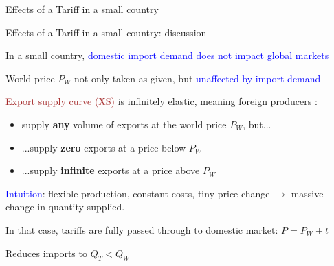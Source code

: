 \documentclass[notes,11pt, aspectratio=169, xcolor=table]{beamer}
\newcommand{\blue}[1]{\textcolor{blue}{#1}}
\newenvironment{wideitemize}{\itemize\addtolength{\itemsep}{10pt}}{\enditemize}
\begin{document}
\begin{frame}{Effects of a Tariff in a small country}
\begin{figure}
\end{figure}
\end{frame}

\begin{frame}{Effects of a Tariff in a small country: discussion}
\begin{wideitemize}
    \item In a small country, \blue{domestic import demand does not impact global markets}

    \item<2-> World price $P_W$ not only taken as given, but \blue{unaffected by import demand}

    \item<3-> \textcolor{brown}{Export supply curve (XS)} is infinitely elastic, meaning foreign producers :
    \begin{itemize}
        \item supply \textbf{any} volume of exports at the world price $P_W$, but...
        \item ...supply \textbf{zero} exports at a price below $P_W$
        \item ...supply \textbf{infinite} exports at a price above $P_W$ 
    \end{itemize}
    \item<4-> \blue{Intuition}: flexible production, constant costs, tiny price change $\rightarrow$ massive change in quantity supplied.
    \item<5-> In that case, tariffs are fully passed through to domestic market: $P = P_W + t$
    \item<6-> Reduces imports to $Q_T < Q_W$
\end{wideitemize}
\end{frame}
\end{document}
